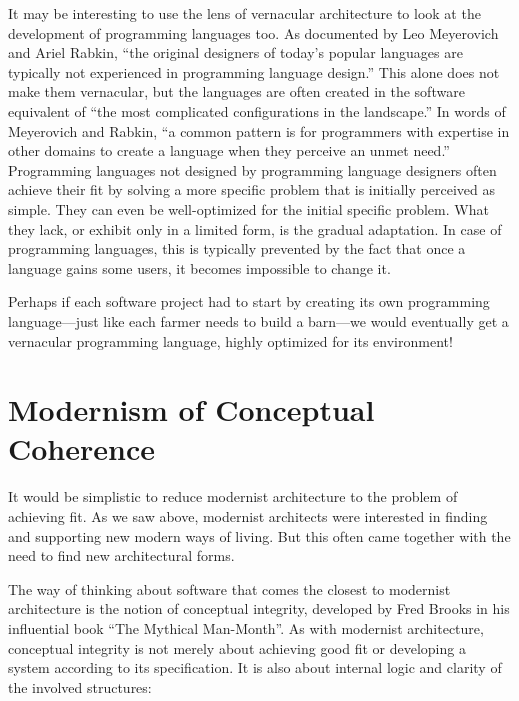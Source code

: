
It may be interesting to use the lens of vernacular architecture to look at the development
of programming languages too. As documented by Leo Meyerovich and Ariel Rabkin,
``the original designers of today’s popular languages are typically not experienced in programming
language design.''
This alone does not make them vernacular, but the languages are often created in the
software equivalent of ``the most complicated configurations in the landscape.''
In words of Meyerovich and Rabkin, ``a common pattern is for programmers with expertise in other
domains to create a language when they perceive an unmet need.''
Programming languages not designed by programming language designers often achieve their
fit by solving a more specific problem that is initially perceived as simple. They can even be
well-optimized for the initial specific problem. What they lack, or exhibit only in a limited
form, is the gradual adaptation. In case of programming languages, this is typically prevented
by the fact that once a language gains some users, it becomes impossible to change it.

Perhaps if each software project had to start by creating its own programming language---just
like each farmer needs to build a barn---we would eventually get a vernacular programming
language, highly optimized for its environment!

\section{Modernism of Conceptual Coherence}

It would be simplistic to reduce modernist architecture to the problem of achieving fit.
As we saw above, modernist architects were interested in finding and supporting new modern ways
of living. But this often came together with the need to find new architectural forms.

The way of thinking about software that comes the closest to modernist architecture is
the notion of conceptual integrity, developed by Fred Brooks in his influential book
``The Mythical Man-Month''. As with modernist architecture, conceptual integrity
is not merely about achieving good fit or developing a system according to its specification.
It is also about internal logic and clarity of the involved structures:

